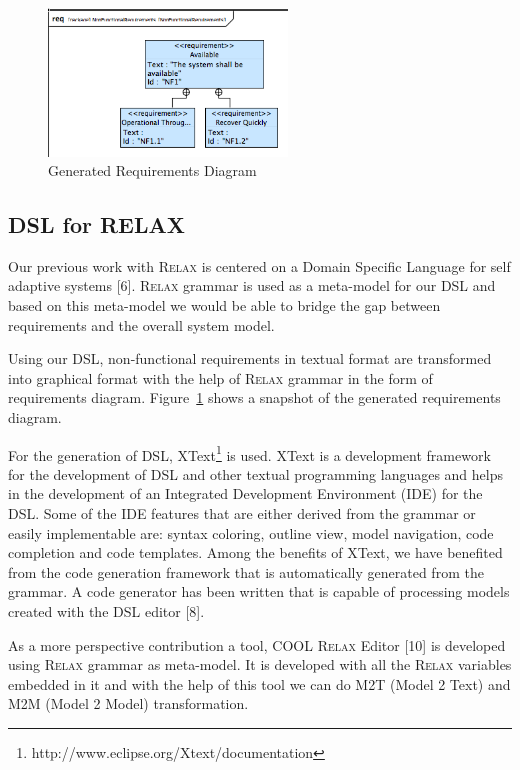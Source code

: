 \documentclass[10pt, conference, compsocconf]{IEEEtran}
\def\myrelax{\textsc{Relax}}                  %
\newcommand{\Myfig}[1]{Figure~\ref{fig:#1}}
\begin{document}
\begin{figure}[!t]
\centering
\includegraphics[width=2.5in]{fig4}
\caption{Generated Requirements Diagram}
\label{fig:reqdiag}
\end{figure}

\subsection{DSL for RELAX}

Our previous work with \myrelax{} is centered on a Domain Specific Language for self adaptive systems [6]. \myrelax{} grammar is used as a meta-model for our DSL and based on this meta-model we would be able to bridge the gap between requirements and the overall system model. 

Using our DSL, non-functional requirements in textual format are transformed into graphical format with the help of \myrelax{} grammar in the form of requirements diagram. \Myfig{reqdiag} shows a snapshot of the generated requirements diagram.  

For the generation of DSL, XText\footnote{http://www.eclipse.org/Xtext/documentation} is used. XText is a development framework for the development of DSL and other textual programming languages and helps in the development of an  Integrated Development Environment (IDE) for the DSL. Some of the IDE features that are either derived from the grammar or easily implementable are: syntax coloring, outline view, model navigation, code completion and code templates. Among the benefits of XText, we have benefited from the code generation framework that is automatically generated from the grammar. A code generator has been written that is capable of processing models created with the DSL editor [8]. 

As a more perspective contribution a tool, COOL \myrelax{} Editor [10] is developed using \myrelax{} grammar as meta-model. It is developed with all the \myrelax{} variables embedded in it and with the help of this tool we can do M2T (Model 2 Text) and M2M (Model 2 Model) transformation. 
\end{document}

